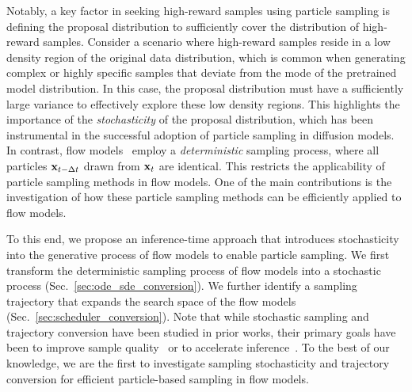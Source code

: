 Notably, a key factor in seeking high-reward samples using particle sampling is defining the proposal distribution to sufficiently cover the distribution of high-reward samples.
Consider a scenario where high-reward samples reside in a low density region of the original data distribution, which is common when generating complex or highly specific samples that deviate from the mode of the pretrained model distribution. 
In this case, the proposal distribution must have a sufficiently large variance to effectively explore these low density regions.
This highlights the importance of the \textit{stochasticity} of the proposal distribution, which has been instrumental in the successful adoption of particle sampling in diffusion models. 
In contrast, flow models~\cite{Lipman:2023CFM} employ a \textit{deterministic} sampling process, where all particles $\mathbf{x}_{t-\Delta t}$ drawn from $\mathbf{x}_{t}$ are identical. 
This restricts the applicability of particle sampling methods in flow models. 
One of the main contributions is the investigation of how these particle sampling methods can be efficiently applied to flow models.

To this end, we propose an inference-time approach that introduces stochasticity into the generative process of flow models to enable particle sampling. 
We first transform the deterministic sampling process of flow models into a stochastic process (Sec.~\ref{sec:ode_sde_conversion}). 
We further identify a sampling trajectory that expands the search space of the flow models (Sec.~\ref{sec:scheduler_conversion}). 
Note that while stochastic sampling and trajectory conversion have been studied in prior works, their primary goals have been to improve sample quality~\cite{xu2023restart, yeo2025stochsync, salimans2022progressive, kingma2021variational, Ma2024:sit} or to accelerate inference~\cite{holderrieth2024generator, shaul2023bespoke, shaul2023kinetic, Karras2022:EDM}. To the best of our knowledge, we are the first to investigate sampling stochasticity and trajectory conversion for efficient particle-based sampling in flow models.

